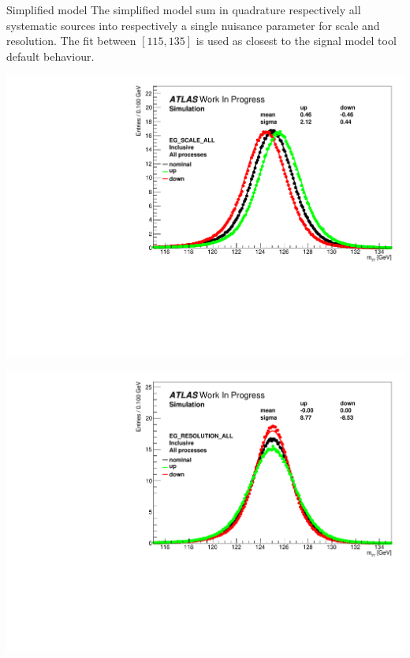 \documentclass[a4paper]{beamer}
\begin{document}
\begin{frame}{Simplified model}
  The simplified model sum in quadrature respectively all systematic sources into respectively a single nuisance parameter for scale and resolution.
  The fit between $[115,135]$ is used as closest to the signal model tool default behaviour.

  \begin{minipage}{0.49\linewidth}
    \includegraphics[width=\linewidth]{plots/h013_EG_SCALE_ALL_0_115135.pdf}
  \end{minipage}
  \hfill
  \begin{minipage}{0.49\linewidth}
    \includegraphics[width=\linewidth]{plots/h013_EG_RESOLUTION_ALL_0_115135.pdf}
  \end{minipage}  
\end{frame}
\end{document}
